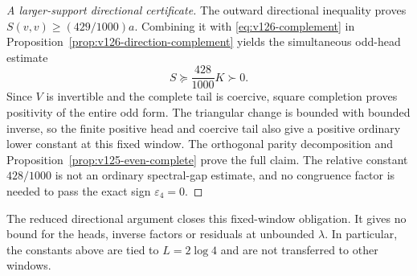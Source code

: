 \documentclass[11pt]{article}
\theoremstyle{remark}
\begin{document}
\begin{proof}[A larger-support directional certificate]
The outward directional inequality proves
$S(v,v)\ge(429/1000)a$. Combining it with
\eqref{eq:v126-complement} in
Proposition~\ref{prop:v126-direction-complement} yields the
simultaneous odd-head estimate
\begin{equation}\label{eq:v126-odd-relative-margin}
 S\succeq\frac{428}{1000}K\succ0.
\end{equation}
Since $V$ is invertible and the complete tail is coercive,
square completion proves positivity of the entire odd form.
The triangular change is bounded with bounded inverse, so the
finite positive head and coercive tail also give a positive
ordinary lower constant at this fixed window. The orthogonal
parity decomposition and Proposition~\ref{prop:v125-even-complete}
prove the full claim. The relative constant $428/1000$ is not
an ordinary spectral-gap estimate, and no congruence factor is
needed to pass the exact sign $\varepsilon_4=0$.
\end{proof}

The reduced directional argument closes this fixed-window obligation.
It gives no bound for the heads, inverse factors or residuals at
unbounded $\lambda$. In particular, the constants above are tied
to $L=2\log4$ and are not transferred to other windows.

\end{document}
